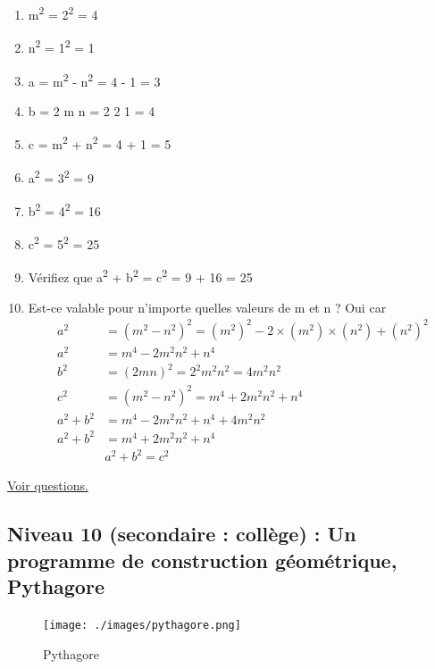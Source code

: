 \documentclass[11pt]{article}
\begin{document}
\begin{enumerate}
\item m\textsuperscript{2} = 2\textsuperscript{2} =  4
\item n\textsuperscript{2} = 1\textsuperscript{2} = 1
\item a = m\textsuperscript{2} - n\textsuperscript{2} = 4 - 1 = 3
\item b = 2 \texttimes{} m \texttimes{} n = 2\texttimes{} 2\texttimes{} 1 = 4
\item c = m\textsuperscript{2} + n\textsuperscript{2} = 4 + 1 = 5
\item a\textsuperscript{2} = 3\textsuperscript{2} = 9
\item b\textsuperscript{2} = 4\textsuperscript{2} = 16
\item c\textsuperscript{2} = 5\textsuperscript{2} = 25
\item Vérifiez que  a\textsuperscript{2} + b\textsuperscript{2} = c\textsuperscript{2} = 9 + 16 = 25
\item Est-ce valable pour n'importe quelles valeurs de m et n ? Oui car
\begin{align*}
    a^2 &= (m^2 - n^2)^2 = (m^2)^2 - 2\times (m^2)\times (n^2) + (n^2)^2 \\
    a^2 &= m^4 - 2m^2n^2 + n^4 \\
    b^2 &= (2mn)^2 = 2^2m^2n^2 = 4m^2n^2 \\
    c^2 &= (m^2 - n^2)^2 = m^4 + 2m^2n^2 + n^4 \\
    a^2 + b^2 &= m^4 - 2m^2n^2 + n^4 + 4m^2n^2 \\
    a^2 + b^2 &= m^4 + 2m^2n^2 + n^4\\
    &\boxed{a^2 + b^2 = c^2}
\end{align*}
\end{enumerate}


\hyperref[org1de94a3]{Voir questions.}


\newpage


\subsection{Niveau 10 (secondaire : collège) : Un programme de construction géométrique, Pythagore}
\label{sec:org60219cf}

\label{orgd2e6a1a}

\begin{figure}[htbp]
\centering
\texttt{[image: ./images/pythagore.png]}
\caption{Pythagore}
\end{figure}
\end{document}
